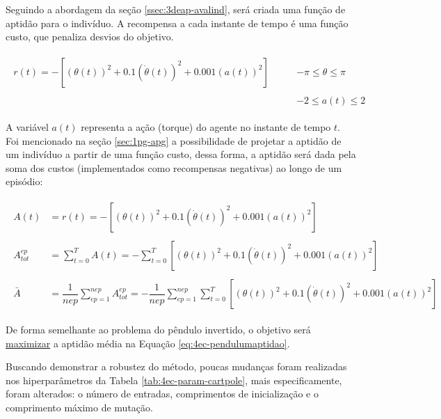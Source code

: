 Seguindo a abordagem da seção \ref{ssec:3deap-avalind}, será criada uma função de aptidão para o indivíduo. A recompensa a cada instante de tempo é uma função custo, que penaliza desvios do objetivo.

\begin{align}\label{eq:4ec-pendulumrewardfunction}
	\begin{split}
		r(t) = - \left[(\theta(t))^2 + 0.1(\dot\theta(t))^2+0.001(a(t))^2\right]\qquad &-\pi \le \theta \le \pi\\\\
															 	  &-2 \le a(t) \le 2
	\end{split}
\end{align}

A variável $a(t)$ representa a ação (torque) do agente no instante de tempo $t$. Foi mencionado na seção \ref{sec:1pg-apg} a possibilidade de projetar a aptidão de um indivíduo a partir de uma função custo, dessa forma, a aptidão será dada pela soma dos custos (implementados como recompensas negativas) ao longo de um episódio:

\begin{align}\label{eq:4ec-pendulumaptidao}
	\begin{split}
		A(t) &= r(t) = - \left[(\theta(t))^2 + 0.1(\dot\theta(t))^2+0.001(a(t))^2\right]\\\\
		A_{tot}^{ep} &= \sum_{t=0}^{T} A(t) = - \sum_{t=0}^{T} \left[
		(\theta(t))^2 + 0.1(\dot\theta(t))^2+0.001(a(t))^2
		\right]\\\\
		\bar{A} &= \dfrac{1}{nep}\sum_{ep=1}^{nep} A_{tot}^{ep} = 
		-\dfrac{1}{nep}\sum_{ep=1}^{nep}\sum_{t=0}^{T} \left[
		(\theta(t))^2 + 0.1(\dot\theta(t))^2+0.001(a(t))^2
		\right]
	\end{split}
\end{align}

De forma semelhante ao problema do pêndulo invertido, o objetivo será \underline{maximizar} a aptidão média na Equação \ref{eq:4ec-pendulumaptidao}. 

Buscando demonstrar a robustez do método, poucas mudanças foram realizadas nos hiperparâmetros da Tabela \ref{tab:4ec-param-cartpole}, mais especificamente, foram alterados: o número de entradas, comprimentos de inicialização e o comprimento máximo de mutação. 

